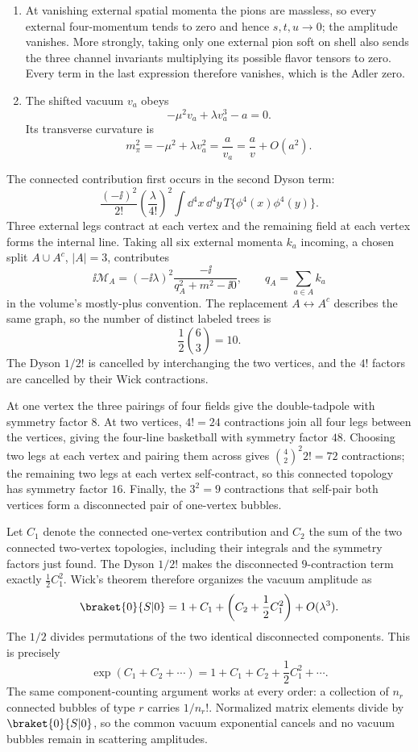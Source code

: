 \begin{enumerate}
\begin{enumerate}
\[ +\delta_{il}\delta_{jk}\frac{u}{u-m_\sigma^2}\right].
\]
\item
At vanishing external spatial momenta the pions are massless, so every
external four-momentum tends to zero and hence \(s,t,u\to0\); the
amplitude vanishes.  More strongly, taking only one external pion soft
on shell also sends the three channel invariants multiplying its possible
flavor tensors to zero.  Every term in the last expression therefore
vanishes, which is the Adler zero.
\item
The shifted vacuum \(v_a\) obeys
\[
 -\mu^2v_a+\lambda v_a^3-a=0.
\]
Its transverse curvature is
\[
 m_\pi^2=-\mu^2+\lambda v_a^2=\frac{a}{v_a}
 =\frac{a}{v}+O(a^2).
\]
\end{enumerate}

The connected contribution first occurs in the second Dyson term:
\[
 \frac{(-\ii)^2}{2!}\left(\frac{\lambda}{4!}\right)^2
 \int \dd^4x\,\dd^4y\,
 T\{\phi^4(x)\phi^4(y)\}.
\]
Three external legs contract at each vertex and the remaining field at
each vertex forms the internal line.  Taking all six external momenta
\(k_a\) incoming, a chosen split \(A\cup A^c\), \(|A|=3\), contributes
\[
 \ii\mathcal M_A=(-\ii\lambda)^2
 \frac{-\ii}{q_A^2+m^2-\ii0},\qquad
 q_A=\sum_{a\in A}k_a
\]
in the volume's mostly-plus convention.  The replacement
\(A\leftrightarrow A^c\) describes the same graph, so the number of
distinct labeled trees is
\[
 \frac12\binom63=10.
\]
The Dyson \(1/2!\) is cancelled by interchanging the two vertices, and
the \(4!\) factors are cancelled by their Wick contractions.

At one vertex the three pairings of four fields give the
double-tadpole with symmetry factor \(8\).  At two vertices, \(4!=24\)
contractions join all four legs between the vertices, giving the
four-line basketball with symmetry factor \(48\).  Choosing two legs at
each vertex and pairing them across gives
\(\binom42^2 2!=72\) contractions; the remaining two legs at each vertex
self-contract, so this connected topology has symmetry factor \(16\).
Finally, the \(3^2=9\) contractions that self-pair both vertices form a
disconnected pair of one-vertex bubbles.

Let \(C_1\) denote the connected one-vertex contribution and \(C_2\) the
sum of the two connected two-vertex topologies, including their integrals
and the symmetry factors just found.  The Dyson \(1/2!\) makes the
disconnected \(9\)-contraction term exactly \(\frac12C_1^2\).
Wick's theorem therefore organizes the vacuum amplitude as
\[
 \braket{0}{S|0}
 =1+C_1+\left(C_2+\frac12C_1^2\right)+O(\lambda^3).
\]
The \(1/2\) divides permutations of the two identical disconnected
components.  This is precisely
\[
 \exp(C_1+C_2+\cdots)
 =1+C_1+C_2+\frac12C_1^2+\cdots.
\]
The same component-counting argument works at every order: a collection
of \(n_r\) connected bubbles of type \(r\) carries \(1/n_r!\).
Normalized matrix elements divide by \(\braket{0}{S|0}\), so the common
vacuum exponential cancels and no vacuum bubbles remain in scattering
amplitudes.


\end{enumerate}
